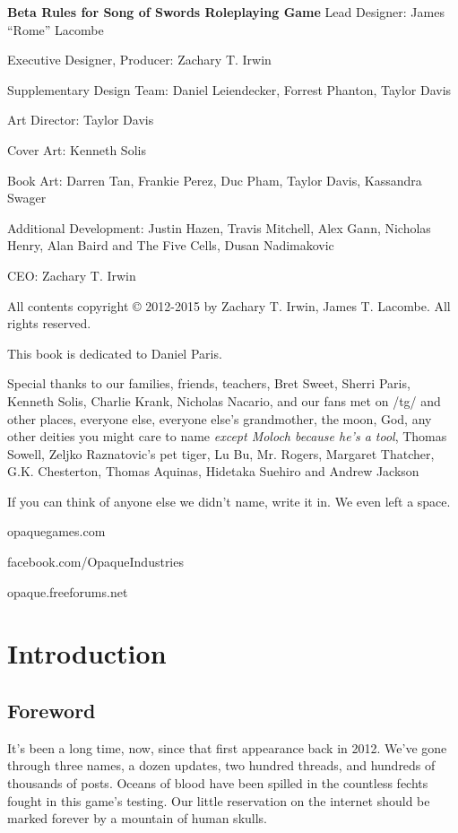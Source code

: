 \documentclass[oneside,11pt,english]{book}
\begin{document}
\begin{center}
\vfill
\textbf{Beta Rules for Song of Swords Roleplaying Game}
Lead Designer: James “Rome” Lacombe\par
Executive Designer, Producer: Zachary T. Irwin\par
Supplementary Design Team: Daniel Leiendecker, Forrest Phanton, Taylor Davis\par
Art Director: Taylor Davis\par
Cover Art: Kenneth Solis\par
Book Art: Darren Tan, Frankie Perez, Duc Pham, Taylor Davis, Kassandra Swager\par


Additional Development: Justin Hazen, Travis Mitchell, Alex Gann, Nicholas Henry, Alan Baird and The Five Cells, Dusan Nadimakovic\par
CEO: Zachary T. Irwin\par


All contents copyright © 2012-2015 by Zachary T. Irwin, James T. Lacombe. All rights reserved.


This book is dedicated to Daniel Paris.
\vfill

Special thanks to our families, friends, teachers, Bret Sweet, Sherri Paris, Kenneth Solis, Charlie Krank, Nicholas Nacario, and our fans met on /tg/ and other places, everyone else, everyone else’s grandmother, the moon, God, any other deities you might care to name \textit{except Moloch because he’s a tool}, Thomas Sowell, Zeljko Raznatovic’s pet tiger, Lu Bu, Mr. Rogers, Margaret Thatcher, G.K. Chesterton, Thomas Aquinas, Hidetaka Suehiro and Andrew Jackson

\vspace{1cm}
If you can think of anyone else we didn’t name, write it in. We even left a space. 

\vfill
opaquegames.com\par
facebook.com/OpaqueIndustries\par
opaque.freeforums.net\par
\end{center}
\clearpage
\tableofcontents%
\mainmatter
\chapter{Introduction}\label{ch:intro}
\newpage
\section*{Foreword}
It’s been a long time, now, since that first appearance back in 2012. We’ve gone through three names, a 
dozen updates, two hundred threads, and hundreds of thousands of posts. Oceans of blood have been 
spilled in the countless fechts fought in this game’s testing. Our little reservation on the internet should be 
marked forever by a mountain of human skulls. 
\end{document}
